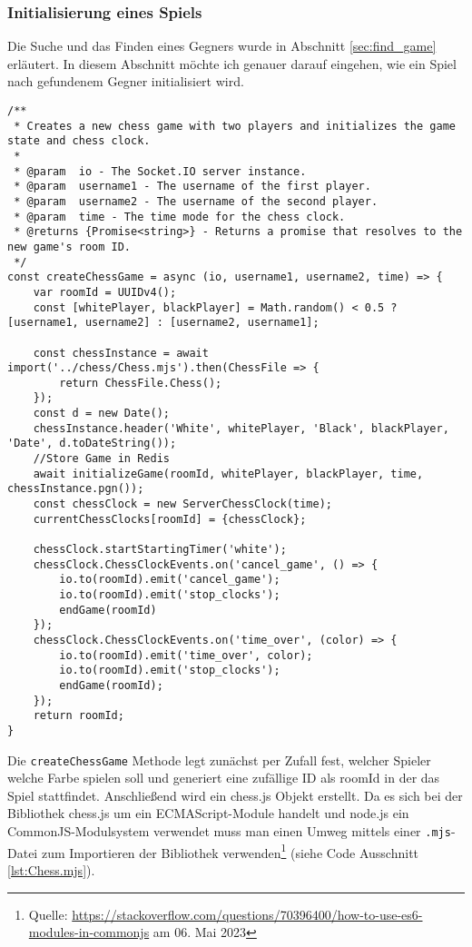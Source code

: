 \subsubsection{Initialisierung eines Spiels}
Die Suche und das Finden eines Gegners wurde in Abschnitt \ref{sec:find_game} erläutert. In diesem Abschnitt möchte ich genauer darauf eingehen, wie ein Spiel nach gefundenem Gegner initialisiert wird.

\begin{lstlisting}[style=codeStyle, caption={Die createChessGame Methode zum Initialisieren einer Schachpartie}, label={lst:createChessGame}]
/**
 * Creates a new chess game with two players and initializes the game state and chess clock.
 *
 * @param  io - The Socket.IO server instance.
 * @param  username1 - The username of the first player.
 * @param  username2 - The username of the second player.
 * @param  time - The time mode for the chess clock.
 * @returns {Promise<string>} - Returns a promise that resolves to the new game's room ID.
 */
const createChessGame = async (io, username1, username2, time) => {
    var roomId = UUIDv4();
    const [whitePlayer, blackPlayer] = Math.random() < 0.5 ? [username1, username2] : [username2, username1];

    const chessInstance = await import('../chess/Chess.mjs').then(ChessFile => {
        return ChessFile.Chess();
    });
    const d = new Date();
    chessInstance.header('White', whitePlayer, 'Black', blackPlayer, 'Date', d.toDateString());
    //Store Game in Redis
    await initializeGame(roomId, whitePlayer, blackPlayer, time, chessInstance.pgn());
    const chessClock = new ServerChessClock(time);
    currentChessClocks[roomId] = {chessClock};

    chessClock.startStartingTimer('white');
    chessClock.ChessClockEvents.on('cancel_game', () => {
        io.to(roomId).emit('cancel_game');
        io.to(roomId).emit('stop_clocks');
        endGame(roomId)
    });
    chessClock.ChessClockEvents.on('time_over', (color) => {
        io.to(roomId).emit('time_over', color);
        io.to(roomId).emit('stop_clocks');
        endGame(roomId);
    });
    return roomId;
}
\end{lstlisting}

Die \verb|createChessGame| Methode legt zunächst per Zufall fest, welcher Spieler welche Farbe spielen soll und generiert eine zufällige ID als roomId in der das Spiel stattfindet. Anschließend wird ein chess.js Objekt erstellt. Da es sich bei der Bibliothek chess.js um ein ECMAScript-Module handelt und node.js ein CommonJS-Modulsystem verwendet muss man einen Umweg mittels einer \verb|.mjs|-Datei zum Importieren der Bibliothek verwenden\footnote{Quelle: \url{https://stackoverflow.com/questions/70396400/how-to-use-es6-modules-in-commonjs} am 06. Mai 2023} (siehe Code Ausschnitt \ref{lst:Chess.mjs}).

